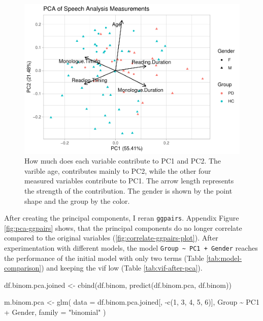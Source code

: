 \documentclass[
  english,
  doc,floatsintext]{apa6}
\newenvironment{Shaded}{\begin{snugshade}}{\end{snugshade}}
\newcommand{\AttributeTok}[1]{\textcolor[rgb]{0.77,0.63,0.00}{#1}}
\newcommand{\DecValTok}[1]{\textcolor[rgb]{0.00,0.00,0.81}{#1}}
\newcommand{\FunctionTok}[1]{\textcolor[rgb]{0.00,0.00,0.00}{#1}}
\newcommand{\NormalTok}[1]{#1}
\newcommand{\OtherTok}[1]{\textcolor[rgb]{0.56,0.35,0.01}{#1}}
\newcommand{\SpecialCharTok}[1]{\textcolor[rgb]{0.00,0.00,0.00}{#1}}
\newcommand{\StringTok}[1]{\textcolor[rgb]{0.31,0.60,0.02}{#1}}
\begin{document}
\begin{figure}

{\centering \includegraphics{dap_report_anja_probst_files/figure-latex/pca-loadings-1} 

}

\caption{How much does each variable contribute to PC1 and PC2. The varible age, contributes mainly to PC2, while the other four measured variables contribute to PC1. The arrow length represents the strength of the contribution. The gender is shown by the point shape and the group by the color.}\label{fig:pca-loadings}
\end{figure}

After creating the principal components, I reran \texttt{ggpairs}. Appendix Figure \ref{fig:pca-ggpairs} shows, that the
principal components do no longer correlate compared to the original variables (\ref{fig:correlate-ggpairs-plot}).
After experimentation with different models, the model \texttt{Group\ \textasciitilde{}\ PC1\ +\ Gender} reaches the performance
of the initial model with only two terms (Table \ref{tab:model-comparison}) and keeping the
vif low (Table \ref{tab:vif-after-pca}).

\begin{Shaded}
\begin{Highlighting}[]
\NormalTok{df.binom.pca.joined }\OtherTok{\textless{}{-}} \FunctionTok{cbind}\NormalTok{(df.binom, }\FunctionTok{predict}\NormalTok{(df.binom.pca, df.binom))}

\NormalTok{m.binom.pca }\OtherTok{\textless{}{-}} \FunctionTok{glm}\NormalTok{(}
    \AttributeTok{data =}\NormalTok{ df.binom.pca.joined[, }\SpecialCharTok{{-}}\FunctionTok{c}\NormalTok{(}\DecValTok{1}\NormalTok{, }\DecValTok{3}\NormalTok{, }\DecValTok{4}\NormalTok{, }\DecValTok{5}\NormalTok{, }\DecValTok{6}\NormalTok{)],}
\NormalTok{    Group }\SpecialCharTok{\textasciitilde{}}\NormalTok{ PC1 }\SpecialCharTok{+}\NormalTok{ Gender,}
    \AttributeTok{family =} \StringTok{"binomial"}
\NormalTok{)}
\end{Highlighting}
\end{Shaded}
\end{document}
